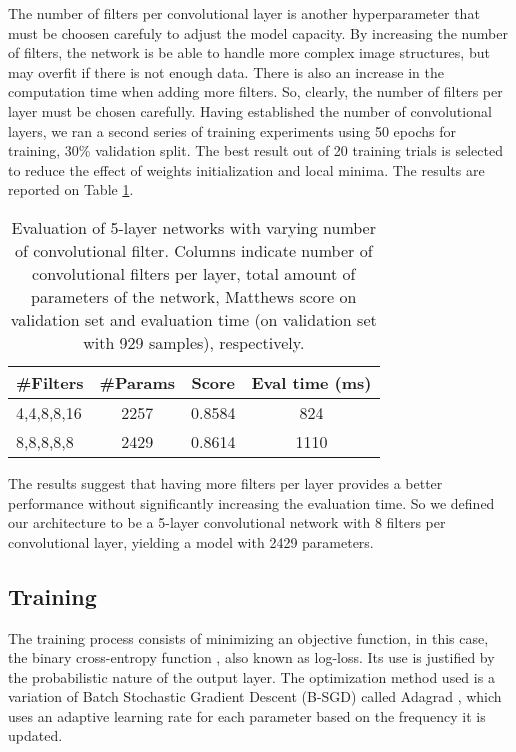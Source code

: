         The number of filters per convolutional layer is another hyperparameter that must be choosen carefuly to adjust the model capacity. By increasing the number of filters, the network is be able to handle more complex image structures, but may overfit if there is not enough data. There is also an increase in the computation time when adding more filters. So, clearly, the number of filters per layer must be chosen carefully. Having established the number of convolutional layers, we ran a second series of training experiments using 50 epochs for training, 30\% validation split. The best result out of 20 training trials is selected to reduce the effect of weights initialization and local minima. The results are reported on Table \ref{table:evalNumberFilters}.

        \begin{table}
      	 \begin{center}
      	  \caption{Evaluation of 5-layer networks with varying number of convolutional filter. Columns indicate number of convolutional filters per layer, total amount of parameters of the network, Matthews score on validation set and evaluation time (on validation set with 929 samples), respectively.}
      	  \label{table:evalNumberFilters}
      	  \begin{tabular}{ | l | c | c | c |}
      	    \hline
      	    \#Filters  & \#Params  &  Score   & Eval time (ms)   \\ \hline
      	    4,4,8,8,16 &   2257    &  0.8584  &    824           \\
      	    8,8,8,8,8  &   2429    &  0.8614  &    1110           \\ \hline
      		  \end{tabular}
      		\end{center}
      	 \end{table}

        The results suggest that having more filters per layer provides a better performance without significantly increasing the evaluation time. So we defined our architecture to be a 5-layer convolutional network with 8 filters per convolutional layer, yielding a model with 2429 parameters.


    \subsection{Training}
    \label{subsec:training}
        The training process consists of minimizing an objective function, in this case, the binary cross-entropy function \cite{DLbook}, also known as log-loss. Its use is justified by the probabilistic nature of the output layer. The optimization method used is a variation of Batch Stochastic Gradient Descent (B-SGD) called Adagrad \cite{duchi2011adaptive}, which uses an adaptive learning rate for each parameter based on the frequency it is updated.

